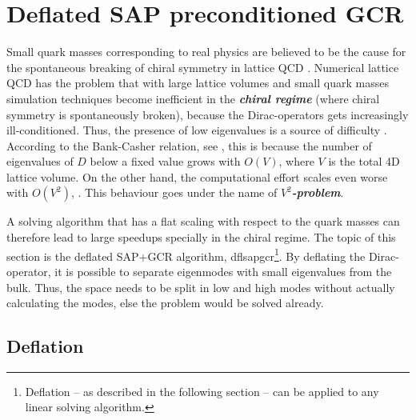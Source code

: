 \documentclass{article}
\theoremstyle{plain} %
\theoremstyle{convention} %
\theoremstyle{remark} %
\def\df#1{\textbf{\textit{#1}}}
\numberwithin{equation}{section}
\begin{document}
\section{Deflated SAP preconditioned GCR}

\label{sec:dfl_sap_gcr}

Small quark masses corresponding to real physics are believed to be the cause for the spontaneous breaking of chiral symmetry in lattice QCD \cite{banks1980}. Numerical lattice QCD has the problem that with large lattice volumes and small quark masses simulation techniques become inefficient in the \df{chiral regime} (where chiral symmetry is spontaneously broken), because the Dirac-operators gets increasingly ill-conditioned. Thus, the presence of low eigenvalues is a source of difficulty \cite{giusti2003}. According to the Bank-Casher relation, see \cite{banks1980}, this is because the number of eigenvalues of $D$ below a fixed value grows with $O(V)$, where $V$ is the total 4D lattice volume. On the other hand, the computational effort scales even worse with $O(V^2)$, \cite{luscher2007}. This behaviour goes under the name of \df{$V^2$-problem}.

A solving algorithm that has a flat scaling with respect to the quark masses can therefore lead to large speedups specially in the chiral regime. The topic of this section is the deflated SAP+GCR algorithm, \acrshort{dflsapgcr}\footnote{Deflation -- as described in the following section -- can be applied to any linear solving algorithm.}. By deflating the Dirac-operator, it is possible to separate eigenmodes with small eigenvalues from the bulk. Thus, the space needs to be split in low and high modes without actually calculating the modes, else the problem would be solved already.

\subsection{Deflation}

\label{sec:deflation}
\end{document}
